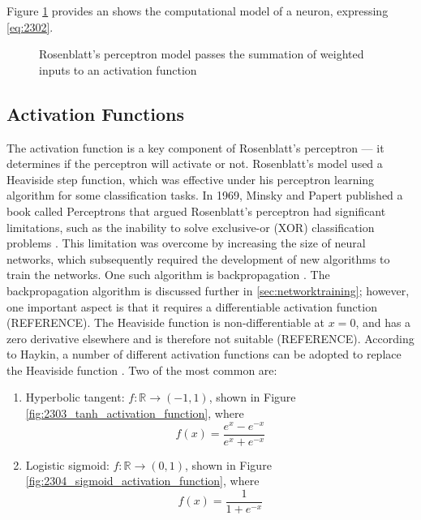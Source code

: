 Figure \ref{fig:2301_perceptron_model} provides an shows the computational model of a neuron, expressing \ref{eq:2302}.

\begin{figure}[h]
	\centering
	
	\caption[Computational model of a perceptron]{Rosenblatt's perceptron model passes the summation of weighted inputs to an activation function}
	\label{fig:2301_perceptron_model}
\end{figure}



\subsection{Activation Functions}\label{sec:activation_functions}
The activation function is a key component of Rosenblatt's perceptron --- it determines if the perceptron will activate or not. Rosenblatt's model used a Heaviside step function, which was effective under his perceptron learning algorithm for some classification tasks. In 1969, Minsky and Papert published a book called Perceptrons that argued Rosenblatt's perceptron had significant limitations, such as the inability to solve exclusive-or (XOR) classification problems \cite{Minsky1969}. This limitation was overcome by increasing the size of neural networks, which subsequently required the development of new algorithms to train the networks. One such algorithm is backpropagation \cite{Werbos1982}. The backpropagation algorithm is discussed further in \textsection \ref{sec:networktraining}; however, one important aspect is that it requires a differentiable activation function (REFERENCE). The Heaviside function is non-differentiable at $x = 0$, and has a zero derivative elsewhere and is therefore not suitable (REFERENCE). According to Haykin, a number of different activation functions can be adopted to replace the Heaviside function \cite{Haykin99}. Two of the most common are:
\begin{enumerate}
	\item Hyperbolic tangent: $f:\mathbb{R} \to (-1,1)$, shown in Figure \ref{fig:2303_tanh_activation_function}, where
	\begin{equation}
		f(x) = \frac{e^x - e^{-x}}{e^x + e^{-x}}
	\end{equation}
	\item Logistic sigmoid: $f:\mathbb{R} \to (0,1)$, shown in Figure \ref{fig:2304_sigmoid_activation_function}, where
	\begin{equation}
		f(x) = \frac{1}{1 + e^{-x}}
	\end{equation}
\end{enumerate}

